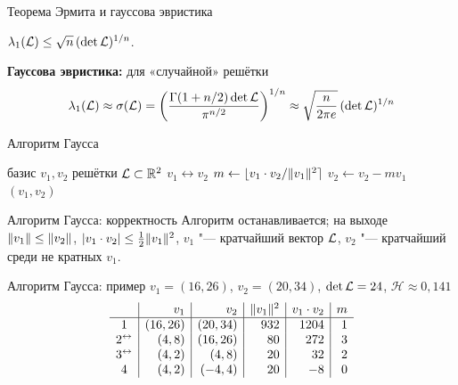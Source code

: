 \documentclass{ca-slides}
\begin{document}
\begin{canvasframe}{Теорема Эрмита и гауссова эвристика}
  \begin{theorem}[Эрмит]
    $\lambda_1(\mathcal{L}) \le \sqrt n\,(\det \mathcal{L})^{1/n}$.
  \end{theorem}
  \penspace[0.2\textheight]
  \textbf{Гауссова эвристика:} для «случайной» решётки
  \[\lambda_1(\mathcal{L}) \approx \sigma(\mathcal{L}) = \left(\frac{\Gamma(1 + n/2)\det \mathcal{L}}{\pi^{n/2}}\right)^{1/n}
    \approx \sqrt{\frac{n}{2\pi e}}\,(\det \mathcal{L})^{1/n}\]
\end{canvasframe}

\begin{canvasframe}{Алгоритм Гаусса}
  \begin{algorithmic}[1]
    \Require базис $v_1, v_2$ решётки $\mathcal{L} \subset \mathbb{R}^2$
    \Repeat
       \State $v_1 \leftrightarrow v_2$ \EndIf
      \State $m \gets \lfloor v_1 \cdot v_2 / \lVert v_1\rVert^2\rceil$
      \State $v_2 \gets v_2 - m v_1$
    \State \Return $(v_1, v_2)$
  \end{algorithmic}
\end{canvasframe}

\begin{theoremframe}{Алгоритм Гаусса: корректность}
  Алгоритм останавливается; на выходе $\lVert v_1\rVert \le \lVert v_2\rVert$,
  $\lvert v_1 \cdot v_2\rvert \le \frac12\lVert v_1\rVert^2$, $v_1$ "--- кратчайший вектор $\mathcal{L}$, $v_2$ "---
  кратчайший среди не кратных $v_1$.
\end{theoremframe}

\begin{canvasframe}{Алгоритм Гаусса: пример}
  $v_1 = (16, 26)$, $v_2 = (20, 34)$, $\det \mathcal{L} = 24$, $\mathcal H \approx 0{,}141$
  \[
  \begin{array}{c|r|r|r|r|r}
   & v_1 & v_2 & \lVert v_1\rVert^2 & v_1 \cdot v_2 & m \\ \hline
  1 & (16, 26) & (20, 34) & 932 & 1204 & 1 \\
  2^{\leftrightarrow} & (4, 8) & (16, 26) & 80 & 272 & 3 \\
  3^{\leftrightarrow} & (4, 2) & (4, 8) & 20 & 32 & 2 \\
  4 & (4, 2) & (-4, 4) & 20 & -8 & 0
  \end{array}
  \]
  \penspace[0.1\textheight]
\end{canvasframe}
\end{document}

